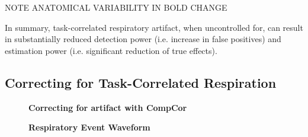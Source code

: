 \documentclass[9pt]{NEU502b-fmri}
\begin{document}
NOTE ANATOMICAL VARIABILITY IN BOLD CHANGE

In summary, task-correlated respiratory artifact, when uncontrolled for, can result in substantially reduced detection power (i.e. increase in false positives) and estimation power (i.e. significant reduction of true effects). 

\subsection{Correcting for Task-Correlated Respiration}

\begin{figure}
\centerline{%
%
}
\caption{\textbf{Correcting for artifact with CompCor}}

\end{figure}

\begin{figure}
\centerline{%
%
}
\caption{\textbf{Respiratory Event Waveform}}

\end{figure}
\end{document}
